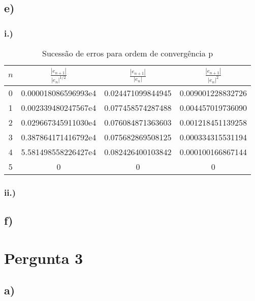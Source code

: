 \documentclass[a4paper, 12pt]{article}
\begin{document}
\subsection*{e)}
	\subsubsection*{i.)}

	\begin{table}[H]
		\setlength{\tabcolsep}{0.5cm} %
		\renewcommand{\arraystretch}{1.5} %
		\centering
		\caption{Sucessão de erros para ordem de convergência p}
		\begin{tabular}{c|c|c|c}
			$n$ & $\frac{|e_{n+1}|}{|e_n|^{1/2}}$ &  $\frac{|e_{n+1}|}{|e_n|}$ & $\frac{|e_{n+1}|}{|e_n|^{2}}$ \\\hline
			0 & 0.000018086596993e4 & 0.024471099844945 & 0.009001228832726 \\
			1 & 0.002339480247567e4 & 0.077458574287488 & 0.004457019736090 \\
			2 & 0.029667345911030e4 & 0.076084871363603 & 0.001218451139258 \\
			3 & 0.387864171416792e4 & 0.075682869508125 & 0.000334315531194 \\
			4 & 5.581498558226427e4 & 0.082426400103842 & 0.000100166867144 \\
			5 & 0                   & 0                 & 0 \\
		\end{tabular}
	\end{table}


\subsubsection*{ii.)}
\subsection*{f)}

\section{Pergunta 3}
\subsection*{a)}
\end{document}
